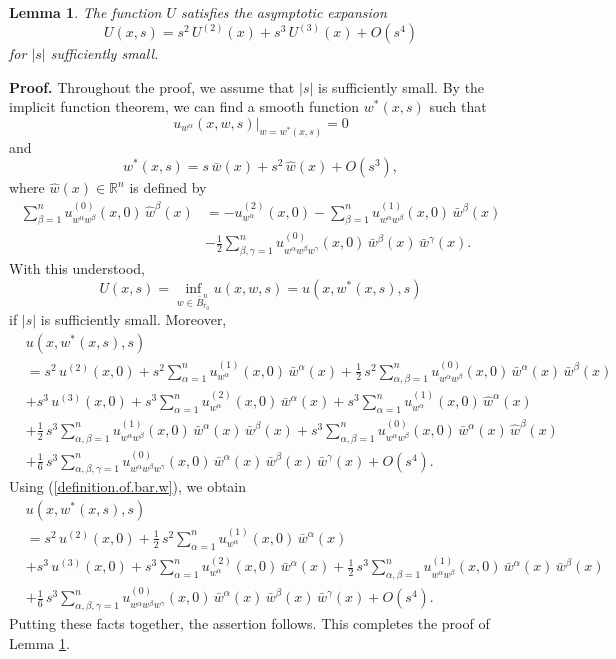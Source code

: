 \documentclass[11pt]{amsart}
\newtheorem{lemma}[theorem]{Lemma}
\theoremstyle{definition}
\begin{document}
\begin{lemma}
\label{asymptotic.expansion.of.U}
The function $U$ satisfies the asymptotic expansion 
\[U(x,s) = s^2 \, U^{(2)}(x) + s^3 \, U^{(3)}(x) + O(s^4)\] 
for $|s|$ sufficiently small.
\end{lemma}

\textbf{Proof.}
Throughout the proof, we assume that $|s|$ is sufficiently small. By the implicit function theorem, we can find a smooth function $w^*(x,s)$ such that 
\[u_{w^\alpha}(x,w,s) \big |_{w=w^*(x,s)} = 0\] 
and 
\[w^*(x,s) = s \, \bar{w}(x) + s^2 \, \hat{w}(x) + O(s^3),\] 
where $\hat{w}(x) \in \mathbb{R}^n$ is defined by 
\begin{align*} 
\sum_{\beta=1}^n u^{(0)}_{w^\alpha w^\beta}(x,0) \, \hat{w}^\beta(x) 
&= -u^{(2)}_{w^\alpha}(x,0) - \sum_{\beta=1}^n u^{(1)}_{w^\alpha w^\beta}(x,0) \, \bar{w}^\beta(x) \\ 
&- \frac{1}{2} \sum_{\beta,\gamma=1}^n u^{(0)}_{w^\alpha w^\beta w^\gamma}(x,0) \, \bar{w}^\beta(x) \, \bar{w}^\gamma(x). 
\end{align*} 
With this understood, 
\[U(x,s) = \inf_{w \in \bar{B}_{r_0}^n} u(x,w,s) = u(x,w^*(x,s),s)\] 
if $|s|$ is sufficiently small. Moreover, 
\begin{align*} 
&u(x,w^*(x,s),s) \\ 
&= s^2 \, u^{(2)}(x,0) + s^2 \sum_{\alpha=1}^n u^{(1)}_{w^\alpha}(x,0) \, \bar{w}^\alpha(x) + \frac{1}{2} \, s^2 \sum_{\alpha,\beta=1}^n u^{(0)}_{w^\alpha w^\beta}(x,0) \, \bar{w}^\alpha(x) \, \bar{w}^\beta(x) \\ 
&+ s^3 \, u^{(3)}(x,0) + s^3 \sum_{\alpha=1}^n u^{(2)}_{w^\alpha}(x,0) \, \bar{w}^\alpha(x) + s^3 \sum_{\alpha=1}^n u^{(1)}_{w^\alpha}(x,0) \, \hat{w}^\alpha(x) \\ 
&+ \frac{1}{2} \, s^3 \sum_{\alpha,\beta=1}^n u^{(1)}_{w^\alpha w^\beta}(x,0) \, \bar{w}^\alpha(x) \, \bar{w}^\beta(x) + s^3 \sum_{\alpha,\beta=1}^n u^{(0)}_{w^\alpha w^\beta}(x,0) \, \bar{w}^\alpha(x) \, \hat{w}^\beta(x) \\ 
&+ \frac{1}{6} \, s^3 \sum_{\alpha,\beta,\gamma=1}^n u^{(0)}_{w^\alpha w^\beta w^\gamma}(x,0) \, \bar{w}^\alpha(x) \, \bar{w}^\beta(x) \, \bar{w}^\gamma(x) + O(s^4). 
\end{align*}
Using (\ref{definition.of.bar.w}), we obtain 
\begin{align*} 
&u(x,w^*(x,s),s) \\ 
&= s^2 \, u^{(2)}(x,0) + \frac{1}{2} \, s^2 \sum_{\alpha=1}^n u^{(1)}_{w^\alpha}(x,0) \, \bar{w}^\alpha(x) \\ 
&+ s^3 \, u^{(3)}(x,0) + s^3 \sum_{\alpha=1}^n u^{(2)}_{w^\alpha}(x,0) \, \bar{w}^\alpha(x) + \frac{1}{2} \, s^3 \sum_{\alpha,\beta=1}^n u^{(1)}_{w^\alpha w^\beta}(x,0) \, \bar{w}^\alpha(x) \, \bar{w}^\beta(x) \\ 
&+ \frac{1}{6} \, s^3 \sum_{\alpha,\beta,\gamma=1}^n u^{(0)}_{w^\alpha w^\beta w^\gamma}(x,0) \, \bar{w}^\alpha(x) \, \bar{w}^\beta(x) \, \bar{w}^\gamma(x) + O(s^4). 
\end{align*}
Putting these facts together, the assertion follows. This completes the proof of Lemma \ref{asymptotic.expansion.of.U}. \\
\end{document}
